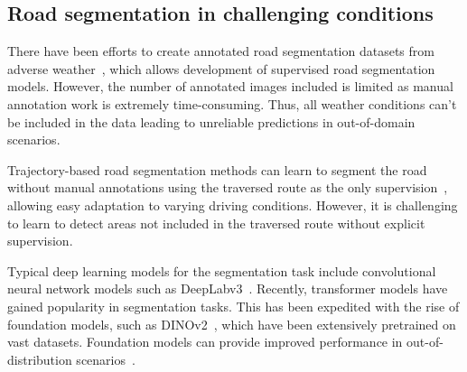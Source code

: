 

\subsection{Road segmentation in challenging conditions}

There have been efforts to create annotated road segmentation datasets from adverse weather~\cite{sakaridis2021acdc, kurup2023winter,diaz2022ithaca365,shaik2024idd,vachmanus2020semantic}, which allows development of supervised road segmentation models. However, the number of annotated images included is limited as manual annotation work is extremely time-consuming. Thus, all weather conditions can't be included in the data leading to unreliable predictions in out-of-domain scenarios. 

Trajectory-based road segmentation methods can learn to segment the road without manual annotations using the traversed route as the only supervision~\cite{alamikkotervo2024tadap,alamikkotervo2024trajectory,seo2023learning,schmid2022self,jung2024v}, allowing easy adaptation to varying driving conditions. However, it is challenging to learn to detect areas not included in the traversed route without explicit supervision. 

Typical deep learning models for the segmentation task include convolutional neural network models such as DeepLabv3~\cite{chen2017rethinking}. Recently, transformer models have gained popularity in segmentation tasks. This has been expedited with the rise of foundation models, such as DINOv2~\cite{oquab2023dinov2}, which have been extensively pretrained on vast datasets. Foundation models can provide improved performance in out-of-distribution scenarios~\cite{wei2024stronger}.

